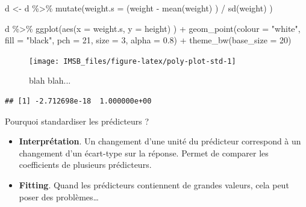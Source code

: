 \documentclass[
  a4paper,11pt,twoside,onecolumn,openright,final,oldfontcommands]{memoir}
\newenvironment{Shaded}{\begin{snugshade}}{\end{snugshade}}
\newcommand{\AttributeTok}[1]{\textcolor[rgb]{0.77,0.63,0.00}{#1}}
\newcommand{\DecValTok}[1]{\textcolor[rgb]{0.00,0.00,0.81}{#1}}
\newcommand{\FloatTok}[1]{\textcolor[rgb]{0.00,0.00,0.81}{#1}}
\newcommand{\FunctionTok}[1]{\textcolor[rgb]{0.00,0.00,0.00}{#1}}
\newcommand{\NormalTok}[1]{#1}
\newcommand{\OtherTok}[1]{\textcolor[rgb]{0.56,0.35,0.01}{#1}}
\newcommand{\SpecialCharTok}[1]{\textcolor[rgb]{0.00,0.00,0.00}{#1}}
\newcommand{\StringTok}[1]{\textcolor[rgb]{0.31,0.60,0.02}{#1}}
\providecommand{\tightlist}{%
  \setlength{\itemsep}{0pt}\setlength{\parskip}{0pt}}
\theoremstyle{definition}
\theoremstyle{definition}
\theoremstyle{definition}
\theoremstyle{definition}
\theoremstyle{remark}
\begin{document}
\begin{Shaded}
\begin{Highlighting}[]
\NormalTok{d }\OtherTok{\textless{}{-}}\NormalTok{ d }\SpecialCharTok{\%\textgreater{}\%} \FunctionTok{mutate}\NormalTok{(}\AttributeTok{weight.s =}\NormalTok{ (weight }\SpecialCharTok{{-}} \FunctionTok{mean}\NormalTok{(weight) ) }\SpecialCharTok{/} \FunctionTok{sd}\NormalTok{(weight) )}

\NormalTok{d }\SpecialCharTok{\%\textgreater{}\%}
    \FunctionTok{ggplot}\NormalTok{(}\FunctionTok{aes}\NormalTok{(}\AttributeTok{x =}\NormalTok{ weight.s, }\AttributeTok{y =}\NormalTok{ height) ) }\SpecialCharTok{+}
    \FunctionTok{geom\_point}\NormalTok{(}\AttributeTok{colour =} \StringTok{"white"}\NormalTok{, }\AttributeTok{fill =} \StringTok{"black"}\NormalTok{, }\AttributeTok{pch =} \DecValTok{21}\NormalTok{, }\AttributeTok{size =} \DecValTok{3}\NormalTok{, }\AttributeTok{alpha =} \FloatTok{0.8}\NormalTok{) }\SpecialCharTok{+}
    \FunctionTok{theme\_bw}\NormalTok{(}\AttributeTok{base\_size =} \DecValTok{20}\NormalTok{)}
\end{Highlighting}
\end{Shaded}

\begin{figure}[!htb]

{\centering \texttt{[image: IMSB\_files/figure-latex/poly-plot-std-1]} 

}

\caption{blah blah...}\label{fig:poly-plot-std}
\end{figure}

\begin{Shaded}
\end{Shaded}

\begin{verbatim}
## [1] -2.712698e-18  1.000000e+00
\end{verbatim}

Pourquoi standardiser les prédicteurs ?

\begin{itemize}
\tightlist
\item
  \textbf{Interprétation}. Un changement d'une unité du prédicteur correspond à un changement d'un écart-type sur la réponse. Permet de comparer les coefficients de plusieurs prédicteurs.
\item
  \textbf{Fitting}. Quand les prédicteurs contiennent de grandes valeurs, cela peut poser des problèmes\ldots{}
\end{itemize}
\end{document}
